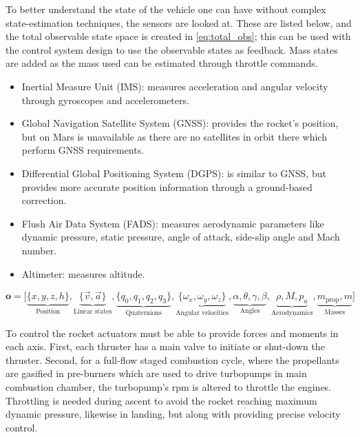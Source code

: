 To better understand the state of the vehicle one can have without complex state-estimation techniques, the sensors are looked at. These are listed below, and the total observable state space is created in \autoref{eq:total_obs}; this can be used with the control system design to use the observable states as feedback. Mass states are added as the mass used can be estimated through throttle commands.
\begin{itemize}
    \item Inertial Measure Unit (IMS): measures acceleration and angular velocity through gyroscopes and accelerometers.
    \item Global Navigation Satellite System (GNSS): provides the rocket's position, but on Mars is unavailable as there are no satellites in orbit there which perform GNSS requirements.
    \item Differential Global Positioning System (DGPS): is similar to GNSS, but provides more accurate position information through a ground-based correction.
    \item Flush Air Data System (FADS): measures aerodynamic parameters like dynamic pressure, static pressure, angle of attack, side-slip angle and Mach number.
    \item Altimeter: measures altitude.
\end{itemize}

\begin{equation}
    \mathbf{o} = \bigg[ \underbrace{\{x, y, z, h\}}_{\text{Position}}, \underbrace{\{\vec{v}, \vec{a}\}}_{\text{Linear states}}, \underbrace{\{q_0, q_1, q_2, q_3\}}_{\text{Quaternions}}, \underbrace{\{\omega_x, \omega_y, \omega_z\}}_{\text{Angular velocities}}, 
    \underbrace{\alpha, \theta, \gamma, \beta}_{\text{Angles}}, \underbrace{\rho, M, p_a}_{\text{Aerodynamics}}, \underbrace{m_{\text{prop}}, m}_{\text{Masses}}\bigg]
\label{eq:total_obs}
\end{equation}

To control the rocket actuators must be able to provide forces and moments in each axis. First, each thruster has a main valve to initiate or shut-down the thruster. Second, for a full-flow staged combustion cycle, where the propellants are gasified in pre-burners which are used to drive turbopumps in main combustion chamber, the turbopump's rpm is altered to throttle the engines. Throttling is needed during ascent to avoid the rocket reaching maximum dynamic pressure, likewise in landing, but along with providing precise velocity control.

